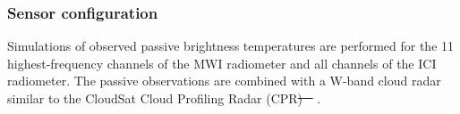 \documentclass[journal abbreviation, manuscript]{copernicus}
\providecommand{\DIFadd}[1]{{\protect\color{blue}\uwave{#1}}} %
\providecommand{\DIFdel}[1]{{\protect\color{red}\sout{#1}}}                      %
\providecommand{\DIFaddbegin}{} %
\providecommand{\DIFaddend}{} %
\providecommand{\DIFdelbegin}{} %
\providecommand{\DIFdelend}{} %
\begin{document}
\subsubsection{Sensor configuration}
\label{sec:sensors}

Simulations of observed passive brightness temperatures are performed for the 11
highest-frequency channels of the MWI radiometer and all channels of the ICI
radiometer. The passive observations are combined with a W-band cloud radar
similar to the CloudSat Cloud Profiling Radar (CPR\DIFdelbegin \DIFdel{)
\mbox{%
\citep{stephens02,tanelli08}}\hspace{0pt}%
}\DIFdelend \DIFaddbegin \DIFadd{, \mbox{%
\citet{stephens02,tanelli08}}\hspace{0pt}%
)}\DIFaddend .
\end{document}
